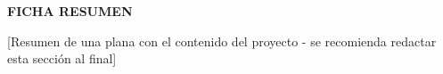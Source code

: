 \documentclass[12pt,letterpaper]{report}
\begin{document}
\clearpage
\thispagestyle{plain}
\begin{center}
\textbf{FICHA RESUMEN}
\end{center}
[Resumen de una plana con el contenido del proyecto - se recomienda redactar esta sección al final]

\clearpage
{}

\tableofcontents
\clearpage

\listoffigures
\clearpage

\listoftables
\clearpage

\hypersetup{pageanchor=true}













\clearpage
\renewcommand{\bibname}{BIBLIOGRAFÍA}

\nocite{*}


\end{document}
